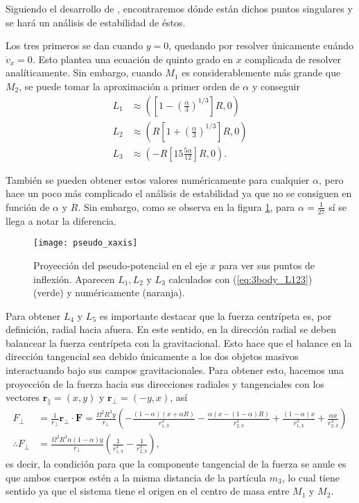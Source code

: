 Siguiendo el desarrollo de \cite{}, encontraremos dónde están dichos puntos singulares y se hará un análisis de estabilidad de éstos.

Los tres primeros se dan cuando $y=0$, quedando por resolver únicamente cuándo $\dot{v}_x = 0$. Esto plantea una ecuación de quinto grado en $x$ complicada de resolver analíticamente. Sin embargo, cuando $M_1$ es considerablemente más grande que $M_2$, se puede tomar la aproximación a primer orden de $\alpha$ y conseguir
\begin{align}
 L_1 &\approx \left( \left[ 1 - \left(\frac{\alpha}{3}\right)^{1/3} \right] R , 0 \right) \nonumber \\ 
 L_2 &\approx \left( R\left[ 1 + \left(\frac{\alpha}{3}\right)^{1/3} \right] R , 0 \right) \nonumber \\
 L_3 &\approx \left( -R\left[ 1 5 \frac{5 \alpha}{12} \right] R, 0 \right).
 \label{eq:3body_L123}
\end{align} 

También se pueden obtener estos valores numéricamente para cualquier $\alpha$, pero hace un poco más complicado el análisis de estabilidad ya que no se consiguen en función de $\alpha$ y $R$. Sin embargo, como se observa en la figura \ref{fig:3body_pseudo_xaxis}, para $\alpha = \frac{1}{27}$ sí se llega a notar la diferencia.

\begin{figure}[h!]
 \centering
 \texttt{[image: pseudo\_xaxis]}
 \caption{Proyección del pseudo-potencial en el eje $x$ para ver sus puntos de inflexión. Aparecen $L_1, L_2$ y $L_3$ calculados con (\ref{eq:3body_L123}) (verde) y numéricamente (naranja).}
 \label{fig:3body_pseudo_xaxis}
\end{figure}

Para obtener $L_4$ y $L_5$ es importante destacar que la fuerza centrípeta es, por definición, radial hacia afuera. En este sentido, en la dirección radial se deben balancear la fuerza centrípeta con la gravitacional. Esto hace que el balance en la dirección tangencial sea debido únicamente a los dos objetos masivos interactuando bajo sus campos gravitacionales. Para obtener esto, hacemos una proyección de la fuerza hacia sus direcciones radiales y tangenciales con los vectores $\mathbf{r}_{\parallel} = (x,y)$ y $\mathbf{r}_{\bot} = (-y,x)$, así
\begin{align*}
 F_{\bot} &= \frac{1}{r_{\bot}} \mathbf{r}_{\bot} \cdot \mathbf{F} = \frac{\Omega^2R^3 y}{r_{\bot}} \left( - \frac{(1-\alpha)(x + \alpha R)}{ r_{1,3}^3 } - \frac{\alpha(x - (1-\alpha) R)}{ r_{2,3}^3 } + \frac{(1-\alpha)x}{ r_{1,3}^3 } + \frac{\alpha x}{ r_{2,3}^3 } \right) \\
 \therefore F_{\bot} &= \frac{\Omega^2R^3 \alpha (1-\alpha) y}{r_{\bot}} \left( \frac{1}{r_{1,3}^3} - \frac{1}{r_{2,3}^3} \right),
\end{align*}
es decir, la condición para que la componente tangencial de la fuerza se anule es que ambos cuerpos estén a la misma distancia de la partícula $m_3$, lo cual tiene sentido ya que el sistema tiene el origen en el centro de masa entre $M_1$ y $M_2$. 

